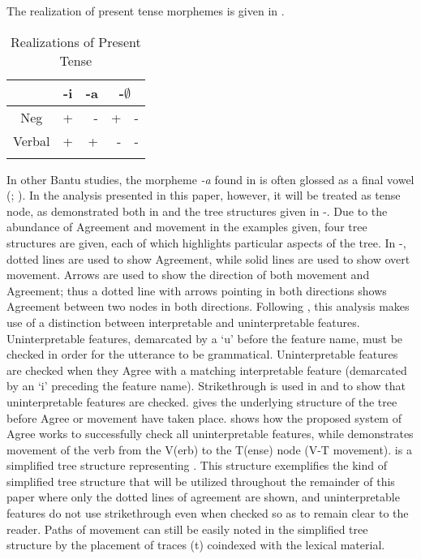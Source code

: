 \documentclass[output=paper]{langsci/langscibook}
\begin{document}
 
The realization of present tense morphemes is given in .

\begin{table}
\caption{Realizations of Present Tense} %
\centering %
\begin{tabular}{c r|r|rr} %
\lsptoprule%
 &\multicolumn{1}{c}{-i}& \multicolumn{1}{|c|}{-a}& \multicolumn{2}{|c}{-$\emptyset$} \\ %
\midrule%
Neg & + & - & + & -\\ %
Verbal & + & + & -& -\\[1ex] %
\lspbottomrule%
\end{tabular}
\label{tab:burkholder:3}
\end{table} 

 
In other Bantu studies, the morpheme \textit{-a} found in  is often glossed as a final vowel (\citealt{Khumalo1981,Khumalo1982}; \citealt{Sibanda2004}). In the analysis presented in this paper, however, it will be treated as tense node, as demonstrated both in  and the tree structures given in -. Due to the abundance of Agreement and movement in the examples given, four tree structures are given, each of which highlights particular aspects of the tree. In -, dotted lines are used to show Agreement, while solid lines are used to show overt movement. Arrows are used to show the direction of both movement and Agreement; thus a dotted line with arrows pointing in both directions shows Agreement between two nodes in both directions. Following \citet{Chomsky2001}, this analysis makes use of a distinction between interpretable and uninterpretable features. Uninterpretable features, demarcated by a `u' before the feature name, must be checked in order for the utterance to be grammatical. Uninterpretable features are checked when they Agree with a matching interpretable feature (demarcated by an `i' preceding the feature name). Strikethrough is used in  and  to show that uninterpretable features are checked.   gives the underlying structure of the tree before Agree or movement have taken place.  shows how the proposed system of Agree works to successfully check all uninterpretable features, while  demonstrates movement of the verb from the V(erb) to the T(ense) node (V-T movement).  is a simplified tree structure representing . This structure exemplifies the kind of simplified tree structure that will be utilized throughout the remainder of this paper where only the dotted lines of agreement are shown, and uninterpretable features do not use strikethrough even when checked so as to remain clear to the reader. Paths of movement can still be easily noted in the simplified tree structure by the placement of traces (t) coindexed with the lexical material.
\end{document}

